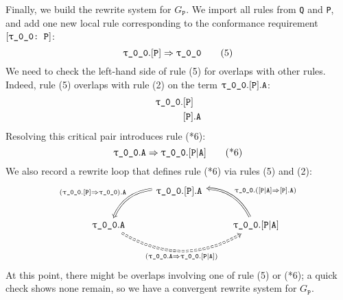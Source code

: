 \documentclass[../generics]{subfiles}
\begin{document}
\begin{example}
Finally, we build the rewrite system for $G_\texttt{P}$. We import all rules from \texttt{Q} and \texttt{P}, and add one new local rule corresponding to the conformance requirement $[\texttt{\texttt{$\uptau$\_0\_0}:~P}]$:
\[
\texttt{$\uptau$\_0\_0}.[\texttt{P}]\Rightarrow \texttt{$\uptau$\_0\_0}\tag{5}
\]
We need to check the left-hand side of rule (5) for overlaps with other rules. Indeed, rule (5) overlaps with rule (2) on the term 
$\texttt{$\uptau$\_0\_0}.[\texttt{P}].\texttt{A}$:
\begin{align*}
\texttt{$\uptau$\_0\_0}.&[\texttt{P}]\\
&[\texttt{P}].\texttt{A}
\end{align*}
Resolving this critical pair introduces rule (*6):
\[
\texttt{$\uptau$\_0\_0}.\texttt{A}\Rightarrow\texttt{$\uptau$\_0\_0}.[\texttt{P}|\texttt{A}]\tag{*6}
\]
We also record a rewrite loop that defines rule (*6) via rules (5) and (2):
\[
\begin{tikzcd}
&\ttgp{0}{0}.\protosym{P}.\texttt{A}\arrow[ld, Rightarrow, "(\ProtoConf{\ttgp{0}{0}}{P}).\texttt{A}"', bend right]\\
\ttgp{0}{0}.\texttt{A}\arrow[rr, Rightarrow, "(\ttgp{0}{0}.\texttt{A}\Rightarrow\ttgp{0}{0}.\assocsym{P}{A})"', bend right, dashed]&&
\ttgp{0}{0}.\assocsym{P}{A}\arrow[ul, Rightarrow, "\ttgp{0}{0}.(\AssocIntroInv{P}{A})"', bend right]
\end{tikzcd}
\]
At this point, there might be overlaps involving one of rule (5) or (*6); a quick check shows none remain, so we have a convergent rewrite system for $G_\texttt{P}$.


\end{example}
\end{document}
